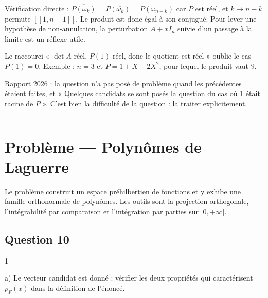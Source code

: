 \documentclass[11pt,a4paper]{article}
\begin{document}
\begin{methode}

Vérification directe : \(\overline{P(\omega_k)}=P(\overline{\omega_k})=P(\omega_{n-k})\) car \(P\) est réel, et \(k\mapsto n-k\) permute \([\![1,n-1]\!]\). Le produit est donc égal à son conjugué. Pour lever une hypothèse de non-annulation, la perturbation \(A+xI_n\) suivie d'un passage à la limite est un réflexe utile.

\end{methode}

\begin{piege}

Le raccourci « \(\det A\) réel, \(P(1)\) réel, donc le quotient est réel » oublie le cas \(P(1)=0\). Exemple : \(n=3\) et \(P=1+X-2X^2\), pour lequel le produit vaut \(9\).

\end{piege}

\begin{jury}

Rapport 2026 : la question n'a pas posé de problème quand les précédentes étaient faites, et « Quelques candidats se sont posés la question du cas où 1 était racine de \(P\) ». C'est bien la difficulté de la question : la traiter explicitement.

\end{jury}

\begin{center}\rule{0.5\linewidth}{0.5pt}\end{center}

\hypertarget{probluxe8me-polynuxf4mes-de-laguerre}{%
\section{Problème --- Polynômes de Laguerre}\label{probluxe8me-polynuxf4mes-de-laguerre}}

Le problème construit un espace préhilbertien de fonctions et y exhibe une famille orthonormale de polynômes. Les outils sont la projection orthogonale, l'intégrabilité par comparaison et l'intégration par parties sur \([0,+\infty[\).

\hypertarget{question-10}{%
\subsection{Question 10}\label{question-10}}

\begin{indication}{1}

a) Le vecteur candidat est donné : vérifier les deux propriétés qui caractérisent \(p_F(x)\) dans la définition de l'énoncé.

\end{indication}
\end{document}
